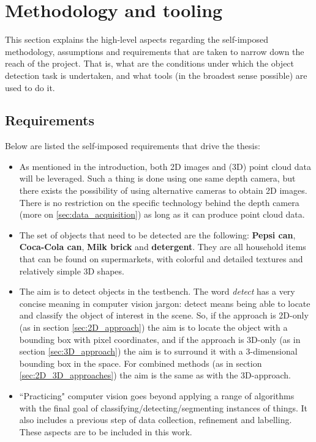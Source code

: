 \documentclass[../main.tex]{subfiles}
\begin{document}
\section{Methodology and tooling} \label{sec:methodology_and_tooling}
This section explains the high-level aspects regarding the self-imposed  methodology, assumptions and requirements that are taken to narrow down the reach of the project. That is, what are the conditions under which the object detection task is undertaken, and what tools (in the broadest sense possible) are used to do it.

\subsection{Requirements}
Below are listed the self-imposed requirements that drive the thesis:
\begin{itemize}
    \item As mentioned in the introduction, both 2D images and (3D) point cloud data will be leveraged. Such a thing is done using one same depth camera, but there exists the possibility of using alternative cameras to obtain 2D images. There is no restriction on the specific technology behind the depth camera (more on \ref{sec:data_acquisition}) as long as it can produce point cloud data.
    \item The set of objects that need to be detected are the following: \textbf{Pepsi can}, \textbf{Coca-Cola can}, \textbf{Milk brick} and \textbf{detergent}. They are all household items that can be found on supermarkets, with colorful and detailed textures and relatively simple 3D shapes.
    \item The aim is to detect objects in the testbench. The word \emph{detect} has a very concise meaning in computer vision jargon: detect means being able to locate and classify the object of interest in the scene. So, if the approach is 2D-only (as in section \ref{sec:2D_approach}) the aim is to locate the object with a bounding box with pixel coordinates, and if the approach is 3D-only (as in section \ref{sec:3D_approach}) the aim is to surround it with a 3-dimensional bounding box in the space. For combined methods (as in section \ref{sec:2D_3D_approaches}) the aim is the same as with the 3D-approach.
    \item ``Practicing" computer vision goes beyond applying a range of algorithms with the final goal of classifying/detecting/segmenting instances of things. It also includes a previous step of data collection, refinement and labelling. These aspects are to be included in this work.

\end{itemize}
\end{document}

